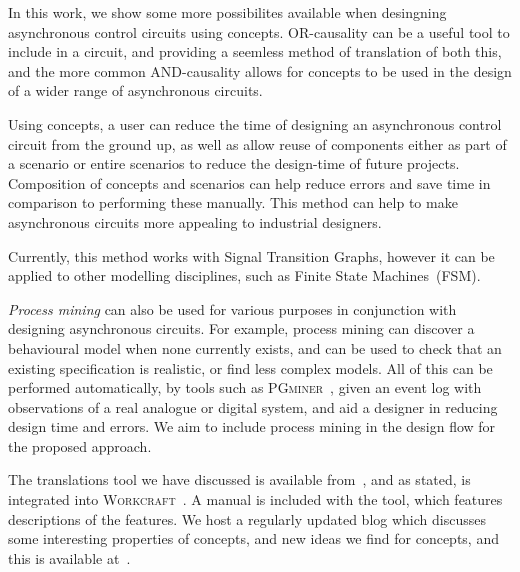 \documentclass[british, journal]{IEEEtran}
\newcommand{\noun}[1]{\textsc{#1}}
\begin{document}
In this work, we show some more possibilites available when desingning
asynchronous control circuits using concepts. OR-causality can be a
useful tool to include in a circuit, and providing a seemless method
of translation of both this, and the more common AND-causality allows
for concepts to be used in the design of a wider range of asynchronous 
circuits.

Using concepts, a user can reduce the time of designing an asynchronous
control circuit from the ground up, as well as allow reuse of components
either as part of a scenario or entire scenarios to reduce the design-time
of future projects. Composition of concepts and scenarios can help
reduce errors and save time in comparison to performing these manually.
This method can help to make asynchronous circuits more appealing
to industrial designers.

Currently, this method works with Signal Transition Graphs, however
it can be applied to other modelling disciplines, such as Finite State
Machines~(FSM).

\emph{Process mining} can also be used for various purposes in conjunction
with designing asynchronous circuits. For example, process mining can discover
a behavioural model when none currently exists, and can be used to check 
that an existing specification is realistic, or find less complex models. 
All of this can be performed automatically, by tools such as
\noun{PGminer}~\cite{mokhov2016mining}, given
an event log with observations of a real analogue or digital system, and aid a
designer in reducing design time and errors. We aim to include process mining
in the design flow for the proposed approach.

The translations tool we have discussed is available from~\cite{2016_concepts_github},
and as stated, is integrated into \noun{Workcraft}~\cite{Workcraft_website}. 
A manual is included with the tool, which features descriptions of the features. 
We host a regularly updated blog which discusses some interesting properties
of concepts, and new ideas we find for concepts, and this is available 
at~\cite{2016_blog_concepts}.


\end{document}

